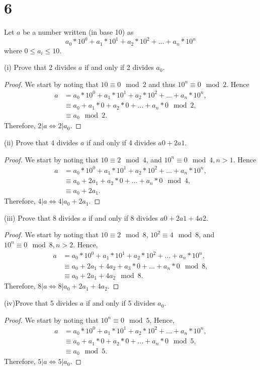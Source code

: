 \documentclass{article}
\begin{document}
\section*{6}
Let $a$ be a number written (in base 10) as
\[a_0 * 10^0 + a_1*10^1 + a_2*10^2 + \dots + a_n*10^n\]
where $0 \leq a_i \leq 10$.

(i) Prove that 2 divides $a$ if and only if 2 divides $a_0$.
\begin{proof}
    We start by noting that $10 \equiv 0 \mod 2$ and thus $10^n \equiv 0 \mod 2$.
    Hence
    \begin{align*}
        a & = a_0 * 10^0 + a_1*10^1 + a_2*10^2 + \dots + a_n*10^n, \\
          & \equiv a_0 + a_1*0 + a_2*0 + \dots + a_n*0 \mod 2,     \\
          & \equiv a_0 \mod 2.
    \end{align*}
    Therefore, $2|a \iff 2|a_0$.
\end{proof}

(ii) Prove that 4 divides $a$ if and only if 4 divides $a0 + 2a1$.
\begin{proof}
    We start by noting that $10 \equiv 2 \mod 4$, and $10^n \equiv 0 \mod 4, n > 1$.
    Hence
    \begin{align*}
        a & = a_0 * 10^0 + a_1*10^1 + a_2*10^2 + \dots + a_n*10^n, \\
          & \equiv a_0 + 2a_1 + a_2*0 + \dots + a_n*0 \mod 4,      \\
          & \equiv a_0 + 2a_1.
    \end{align*}
    Therefore, $4 | a \iff 4 | a_0 + 2a_1$.
\end{proof}

(iii) Prove that 8 divides $a$ if and only if 8 divides $a0 + 2a1 + 4a2$.
\begin{proof}
    We start by noting that $10 \equiv 2 \mod 8$, $10^2 \equiv 4 \mod 8$,
    and $10^n \equiv 0 \mod 8, n > 2$. Hence,
    \begin{align*}
        a & = a_0 * 10^0 + a_1*10^1 + a_2*10^2 + \dots + a_n*10^n,   \\
          & \equiv a_0 + 2a_1 + 4a_2 + a_3*0 + \dots + a_n*0 \mod 8, \\
          & \equiv a_0 + 2a_1 + 4a_2 \mod 8.
    \end{align*}
    Therefore, $8 | a \iff 8 | a_0 + 2a_1 + 4a_2$.
\end{proof}

(iv)Prove that 5 divides $a$ if and only if 5 divides $a_0$.
\begin{proof}
    We start by noting that $10^n \equiv 0 \mod 5$,
    Hence,
    \begin{align*}
        a & = a_0 * 10^0 + a_1*10^1 + a_2*10^2 + \dots + a_n*10^n, \\
          & \equiv a_0 + a_1*0 + a_2*0 + \dots + a_n*0 \mod 5,     \\
          & \equiv a_0 \mod 5.
    \end{align*}
    Therefore, $5 | a \iff 5 | a_0$.
\end{proof}
\end{document}

